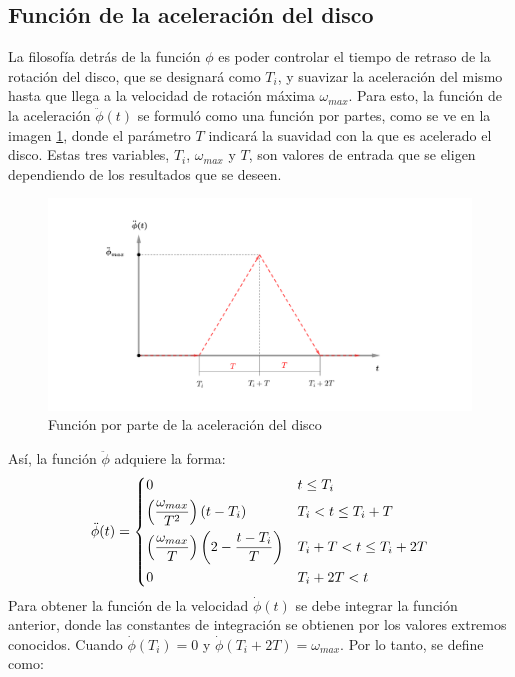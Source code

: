 \subsection{Función de la aceleración del disco}
\label{sec:function_angle}
La filosofía detrás de la función $\phi$ es poder controlar el tiempo de retraso de la rotación del disco, que se designará como $T_i$, y suavizar la aceleración del mismo hasta que llega a la velocidad de rotación máxima $\omega_{max}$. Para esto, la función de la aceleración $\ddot{\phi}(t)$ se formuló como una función por partes, como se ve en la imagen \ref{fig:anglepp}, donde el parámetro $T$ indicará la suavidad con la que es acelerado el disco. Estas tres variables, $T_i$, $\omega_{max}$ y $T$, son valores de entrada que se eligen dependiendo de los resultados que se deseen.
\begin{figure}[h]
\centering
\includegraphics[scale=0.45,trim={6.5cm 2cm 10cm 2cm},clip]{Imagenes/anglepp_function.pdf}
\caption{Función por parte de la aceleración del disco}
\label{fig:anglepp}
\end{figure}
Así, la función $\ddot{\phi}$ adquiere la forma:
\[ \ddot{\phi}(t) =
\begin{dcases}
	0																		&	t \leq T_i \\
	\left(\frac{\omega_{max}}{T^2}\right)\left(t - T_i\right)				&	T_i < t \leq T_i + T\\
	\left(\frac{\omega_{max}}{T}\right)\left(2 - \frac{t - T_i}{T}\right)	&	T_i + T < t \leq T_i + 2T\\
	0																		&	T_i + 2T < t\\
\end{dcases} 
\]
Para obtener la función de la velocidad $\dot{\phi}(t)$ se debe integrar la función anterior, donde las constantes de integración se obtienen por los valores extremos conocidos. Cuando $\dot{\phi}(T_i) = 0$ y $\dot{\phi}(T_i + 2T) = \omega_{max}$. Por lo tanto, se define como:

